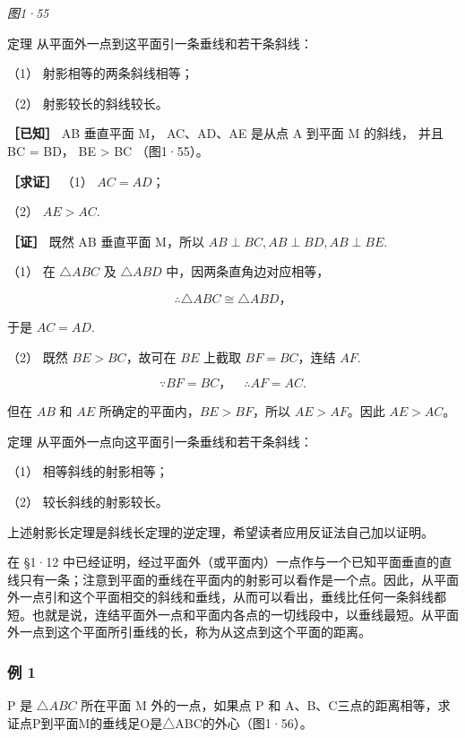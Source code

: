 \emph{图1·55}

定理 从平面外一点到这平面引一条垂线和若干条斜线：

（1） 射影相等的两条斜线相等；

（2） 射影较长的斜线较长。

\textbf{［已知］} AB 垂直平面 M， AC、AD、AE 是从点 A 到平面 M 的斜线，
并且 BC = BD， BE \textgreater{} BC （图1·55）。

\textbf{［求证］} （1） \(AC = AD\)；

（2） \(AE > AC\).

\textbf{［证］} 既然 AB 垂直平面 M，所以
\(AB \perp BC, AB \perp BD, AB \perp BE.\)

（1） 在 \(\triangle ABC\) 及 \(\triangle ABD\)
中，因两条直角边对应相等，

\[
\therefore \triangle A B C \cong \triangle A B D\text{，}
\]

于是 \(AC = AD.\)

（2） 既然 \(BE > BC\)，故可在 \(BE\) 上截取 \(BF = BC\)，连结 \(AF\).

\[
\because B F = B C\text{，} \quad \therefore A F = A C.
\]

但在 \(AB\) 和 \(AE\) 所确定的平面内，\(BE > BF\)，所以
\(AE > AF\)。因此 \(AE > AC\)。

定理 从平面外一点向这平面引一条垂线和若干条斜线：

（1） 相等斜线的射影相等；

（2） 较长斜线的射影较长。

上述射影长定理是斜线长定理的逆定理，希望读者应用反证法自己加以证明。

在 §1·12
中已经证明，经过平面外（或平面内）一点作与一个已知平面垂直的直线只有一条；注意到平面的垂线在平面内的射影可以看作是一个点。因此，从平面外一点引和这个平面相交的斜线和垂线，从而可以看出，垂线比任何一条斜线都短。也就是说，连结平面外一点和平面内各点的一切线段中，以垂线最短。从平面外一点到这个平面所引垂线的长，称为从这点到这个平面的距离。

\subsubsection{例 1}

P 是 \(\triangle ABC\) 所在平面 M 外的一点，如果点 P 和
A、B、C三点的距离相等，求证点P到平面M的垂线足O是△ABC的外心（图1·56）。

